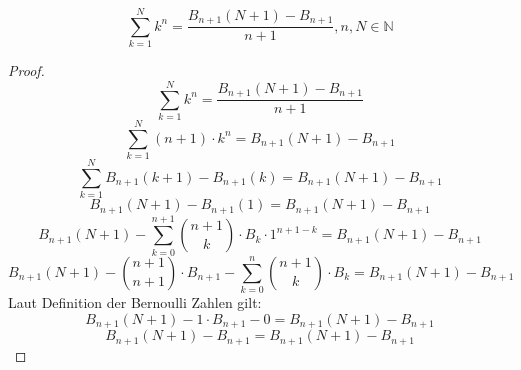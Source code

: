 \documentclass[12pt]{article}
\begin{document}
\begin{corollary}
\[\sum_{k=1}^N k^n = \frac{B_{n+1}(N+1)-B_{n+1}}{n+1}, n, N \in \mathbb{N}\]
\end{corollary}
\begin{proof}
\[\sum_{k=1}^N k^n = \frac{B_{n+1}(N+1) - B_{n+1}}{n+1}\]
\[\sum_{k=1}^N (n+1) \cdot k^n = B_{n+1}(N+1) - B_{n+1}\]
\[\sum_{k=1}^N B_{n+1}(k+1) - B_{n+1}(k) = B_{n+1}(N+1) - B_{n+1}\]
\[B_{n+1}(N+1) - B_{n+1}(1) = B_{n+1}(N+1) - B_{n+1}\]
\[B_{n+1}(N+1) - \sum_{k=0}^{n+1} {n+1 \choose k} \cdot B_k \cdot 1^{n+1-k} = B_{n+1}(N+1) - B_{n+1}\]
\[B_{n+1}(N+1) - {n+1 \choose n+1} \cdot B_{n+1} - \sum_{k=0}^{n} {n+1 \choose k} \cdot B_k = B_{n+1}(N+1) - B_{n+1}\]
Laut Definition der Bernoulli Zahlen gilt:
\[B_{n+1}(N+1) - 1 \cdot B_{n+1} - 0 = B_{n+1}(N+1) - B_{n+1}\]
\[B_{n+1}(N+1) - B_{n+1} = B_{n+1}(N+1) - B_{n+1}\]
\end{proof}
\end{document}
